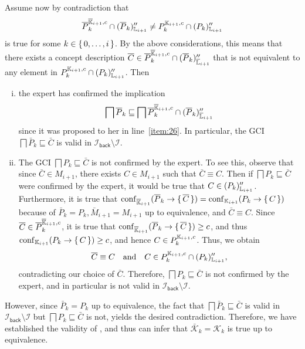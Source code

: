 \begin{Proof}
  Assume now by contradiction that
  \begin{equation*}
    \overline P_{k}^{\overline{{\mathbb{K}}}_{i+1}, c} \cap (\overline P_{k})_{{\mathbb{L}}_{i+1}}'' \neq
    P_{k}^{{\mathbb{K}}_{i+1}, c} \cap (P_{k})_{{\mathbb{L}}_{i+1}}''
  \end{equation*}
  is true for some $k \in {\ensuremath{\{\, 0, \dots, i \,\}}}$.  By the above considerations, this means
  that there exists a concept description $\overline C \in \overline P_{k}^{\overline{{\mathbb{K}}}_{i+1}, c}
  \cap (\overline P_{k})_{\overline{{\mathbb{L}}}_{i+1}}''$ that is not equivalent to any element in
  $P_{k}^{{\mathbb{K}}_{i+1}, c} \cap (P_{k})_{{\mathbb{L}}_{i+1}}''$.  Then
  \begin{enumerate}[i. ]
  \item the expert has confirmed the implication
    \begin{equation*}
      \bigsqcap \overline P_{k} \sqsubseteq \bigsqcap \overline P_{k}^{\overline{{\mathbb{K}}}_{i+1}, c} \cap
      (\overline P_{k})_{\overline{{\mathbb{L}}}_{i+1}}''
    \end{equation*}
    since it was proposed to her in line~\ref{item:26}.  In particular, the GCI $\bigsqcap
    \bar P_{k} \sqsubseteq \bar C$ is valid in $\mathcal{I}_{\mathsf{back}} \setminus
    \mathcal{I}$.
  \item The GCI $\bigsqcap P_{k} \sqsubseteq \bar C$ is not confirmed by the expert.  To
    see this, observe that since $\bar C \in M_{i+1}$, there exists $C \in M_{i+1}$ such
    that $\bar C \equiv C$.  Then if $\bigsqcap P_{k} \sqsubseteq \bar C$ were confirmed
    by the expert, it would be true that $C \in (P_{k})_{{\mathbb{L}}_{i+1}}''$.  Furthermore,
    it is true that $\operatorname{conf}_{\overline{{\mathbb{K}}}_{i+1}}(\overline P_{k} \to {\ensuremath{\{\, \overline C \,\}}}) =
    \operatorname{conf}_{{\mathbb{K}}_{i+1}}(P_{k} \to {\ensuremath{\{\, C \,\}}})$ because of $\bar P_{k} = P_{k}, \bar
    M_{i+1} = M_{i+1}$ up to equivalence, and $\bar C \equiv C$.  Since $\overline C \in \overline
    P_{k}^{\overline{{\mathbb{K}}}_{i+1}, c}$, it is true that $\operatorname{conf}_{\overline{{\mathbb{K}}}_{i+1}}(\overline P_{k}
    \to {\ensuremath{\{\, \overline C \,\}}}) \ge c$, and thus $\operatorname{conf}_{{\mathbb{K}}_{i+1}}(P_{k} \to {\ensuremath{\{\, C \,\}}}) \ge
    c$, and hence $C \in P_{k}^{{\mathbb{K}}_{i+1}, c}$.  Thus, we obtain
    \begin{equation*}
      \overline C \equiv C \quad\text{and}\quad C \in P_{k}^{{\mathbb{K}}_{i+1}, c} \cap
      (P_{k})_{{\mathbb{L}}_{i+1}}'',
    \end{equation*}
    contradicting our choice of $\bar C$.  Therefore, $\bigsqcap P_{k} \sqsubseteq \bar C$
    is not confirmed by the expert, and in particular is not valid in
    $\mathcal{I}_{\mathsf{back}} \setminus \mathcal{I}$.
  \end{enumerate}
  However, since $\bar P_{k} = P_{k}$ up to equivalence, the fact that $\bigsqcap \bar
  P_{k} \sqsubseteq \bar C$ is valid in $\mathcal{I}_{\mathsf{back}} \setminus
  \mathcal{I}$ but $\bigsqcap P_{k} \sqsubseteq \bar C$ is not, yields the desired
  contradiction.  Therefore, we have established the validity of , and thus
  can infer that $\bar{\mathcal{K}}_{k} = \mathcal{K}_{k}$ is true up to equivalence.


\end{Proof}
